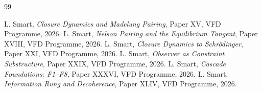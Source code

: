 \documentclass[12pt]{article}
\theoremstyle{definition}
\theoremstyle{remark}
\begin{document}

\begin{thebibliography}{99}

 L. Smart, \emph{Closure Dynamics and Madelung Pairing}, Paper XV, VFD Programme, 2026.
 L. Smart, \emph{Nelson Pairing and the Equilibrium Tangent}, Paper XVIII, VFD Programme, 2026.
 L. Smart, \emph{Closure Dynamics to Schr\"odinger}, Paper XXI, VFD Programme, 2026.
 L. Smart, \emph{Observer as Constraint Substructure}, Paper XXIX, VFD Programme, 2026.
 L. Smart, \emph{Cascade Foundations: F1--F8}, Paper XXXVI, VFD Programme, 2026.
 L. Smart, \emph{Information Rung and Decoherence}, Paper XLIV, VFD Programme, 2026.

\end{thebibliography}
\end{document}
